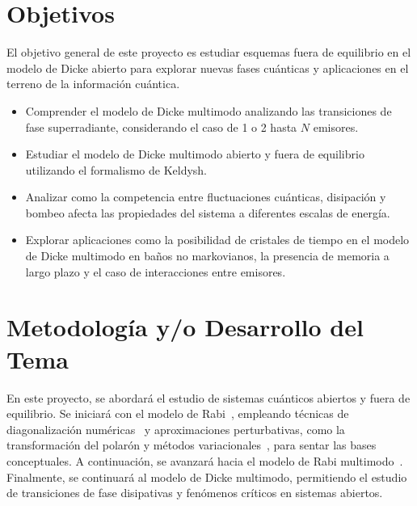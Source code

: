 \documentclass[onecolumn,notitlepage,letterpaper,aps,pra,12pt]{article}
\numberwithin{equation}{section}
\begin{document}
\section{Objetivos}

El objetivo general de este proyecto es estudiar esquemas fuera de equilibrio en el modelo de Dicke abierto para explorar nuevas fases cuánticas y aplicaciones en el terreno de la información cuántica. 

\begin{itemize}
    \item Comprender el modelo de Dicke multimodo analizando las transiciones de fase superradiante, considerando el caso de 1 o 2 hasta $N$ emisores.
    \item Estudiar el modelo de Dicke multimodo abierto y fuera de equilibrio utilizando el formalismo de Keldysh. 
    \item Analizar como la competencia entre fluctuaciones cuánticas, disipación y bombeo afecta las propiedades del sistema a diferentes escalas de energía. 
    \item Explorar aplicaciones como la posibilidad de cristales de tiempo en el modelo de Dicke multimodo en baños no markovianos, la presencia de memoria a largo plazo y el caso de interacciones entre emisores. 
\end{itemize}



\section{Metodología y/o Desarrollo del Tema}

En este proyecto, se abordará el estudio de sistemas cuánticos abiertos y fuera de equilibrio. Se iniciará con el modelo de Rabi~\cite{rabi1936}, empleando técnicas  de diagonalización numéricas~\cite{irish2007} y aproximaciones perturbativas, como la transformación del polarón y métodos variacionales~\cite{gonzalez2021}, para sentar las bases conceptuales. A continuación, se avanzará hacia el modelo de Rabi multimodo~\cite{peng2021}. Finalmente, se continuará al modelo de Dicke multimodo, permitiendo el estudio de transiciones de fase disipativas y fenómenos críticos en sistemas abiertos. 
\end{document}
